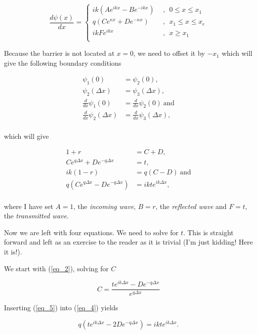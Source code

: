 \documentclass{article}
\begin{document}
\begin{equation}
\frac{d\psi(x)}{dx} = \begin{cases}
ik(Ae^{ikx} - Be^{-ikx}) \ \ &, \ \ 0 \leq x \leq x_1 \\
q(Ce^{\kappa x} + De^{-\kappa x}) \ \ &, \ \ x_1 \leq x \leq x_e \\
ikFe^{ikx}  &, \ \ x \geq x_1 \\
\end{cases}
\end{equation}

Because the barrier is not located at $x=0$, we need to offset it by $-x_1$ which will give the following boundary conditions

\begin{align}
\psi_1(0) &= \psi_2(0), \\
\psi_2(\Delta x) &= \psi_3(\Delta x),\\
\frac{d}{dx}\psi_1(0) &= \frac{d}{dx}\psi_2(0) \ \text{and} \\
\frac{d}{dx}\psi_2(\Delta x) &= \frac{d}{dx}\psi_3(\Delta x), \\
\end{align}

which will give

\begin{align}
1 + r &= C + D, \label{eq_1} \\
Ce^{q\Delta x} + De^{-q\Delta x} &= t, \label{eq_2} \\
ik(1-r) &= q(C - D) \ \text{and} \label{eq_3} \\
q(Ce^{q\Delta x} - De^{-q\Delta x}) &= ikte^{ik\Delta x}, \label{eq_4} \\
\end{align}

where I have set $A = 1$, the \textit{incoming wave}, $B = r$, the \textit{reflected wave} and  $F = t$, the \textit{transmitted wave}.

Now we are left with four equations. We need to solve for $t$. This is straight forward and left as an exercise to the reader as it is trivial (I'm just kidding! Here it is!).

We start with (\ref{eq_2}), solving for $C$

\begin{equation}
C = \frac{te^{ik\Delta x}-De^{-q\Delta x}}{e^{q\Delta x}} \label{eq_5}
\end{equation}

Inserting (\ref{eq_5}) into (\ref{eq_4}) yields

\begin{equation}
q(te^{ik\Delta x} - 2De^{-q\Delta x}) = ikte^{ik\Delta x}.
\end{equation}
\end{document}
